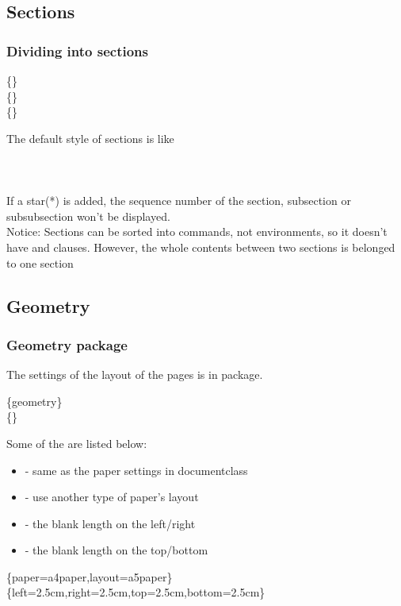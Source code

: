 \subsection{Sections}

\begin{frame}
	\frametitle{Dividing into sections}
	\begin{command}
		\{\}\\
		\{\}\\
		\{\}\\
	\end{command}
	The default style of sections is like\\
	\\
	\\
	\\[0.5em]
	If a star(\alert{*}) is added, the sequence number of the section, subsection or subsubsection won't be displayed.\\
	\alert{Notice:} Sections can be sorted into commands, not environments, so it doesn't have  and  clauses. However, the whole contents between two sections is belonged to one section
\end{frame}

\subsection{Geometry}

\begin{frame}
	\frametitle{Geometry package}
	The settings of the layout of the pages is in  package.
	\begin{command}
		\{geometry\}\\
		\{\structure{options}\}
	\end{command}
	Some of the  are listed below:
	\begin{itemize}
		\item {} - same as the paper settings in documentclass
		\item {} - use another type of paper's layout
		\item {} - the blank length on the left/right
		\item {} - the blank length on the top/bottom
	\end{itemize}
	\begin{example}
		\{paper=a4paper,layout=a5paper\}
		\{left=2.5cm,right=2.5cm,top=2.5cm,bottom=2.5cm\}
	\end{example}
\end{frame}
